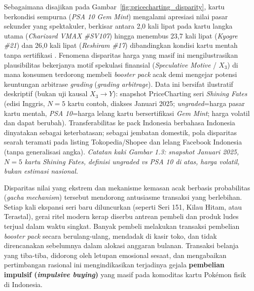 \documentclass[12pt,a4paper]{article}
\numberwithin{equation}{section}
\numberwithin{table}{section}
\numberwithin{figure}{section}
\begin{document}
Sebagaimana disajikan pada Gambar~\ref{fig:pricecharting_disparity}, kartu berkondisi sempurna (\emph{PSA 10 Gem Mint}) mengalami apresiasi nilai pasar sekunder yang spektakuler, berkisar antara 2,0 kali lipat pada kartu langka utama (\emph{Charizard VMAX \#SV107}) hingga menembus 23,7 kali lipat (\emph{Kyogre \#21}) dan 26,0 kali lipat (\emph{Reshiram \#17}) dibandingkan kondisi kartu mentah tanpa sertifikasi \citep{pricecharting2024}. Fenomena disparitas harga yang masif ini mengilustrasikan plausibilitas bekerjanya motif spekulasi finansial (\emph{Speculative Motive} / $X_3$) di mana konsumen terdorong membeli \emph{booster pack} acak demi mengejar potensi keuntungan arbitrase \emph{grading} (\emph{grading arbitrage}). Data ini bersifat ilustratif deskriptif (bukan uji kausal $X_3 \rightarrow Y$): snapshot PriceCharting seri \emph{Shining Fates} (edisi Inggris, $N=5$ kartu contoh, diakses Januari 2025; \emph{ungraded}=harga pasar kartu mentah, \emph{PSA 10}=harga lelang kartu bersertifikasi \emph{Gem Mint}; harga volatil dan dapat berubah). Transferabilitas ke pack Indonesia berbahasa Indonesia dinyatakan sebagai keterbatasan; sebagai jembatan domestik, pola disparitas searah teramati pada listing Tokopedia/Shopee dan lelang Facebook Indonesia (tanpa generalisasi angka). \emph{Catatan kaki Gambar 1.3: snapshot Januari 2025, $N=5$ kartu Shining Fates, definisi ungraded vs PSA 10 di atas, harga volatil, bukan estimasi nasional.}

Disparitas nilai yang ekstrem dan mekanisme kemasan acak berbasis probabilitas (\emph{gacha mechanism}) tersebut mendorong antusiasme transaksi yang berlebihan. Setiap kali ekspansi seri baru diluncurkan (seperti Seri 151, Kilau Hitam, atau Terastal), gerai ritel modern kerap diserbu antrean pembeli dan produk ludes terjual dalam waktu singkat. Banyak pembeli melakukan transaksi pembelian \emph{booster pack} secara berulang-ulang, mendadak di kasir toko, dan tidak direncanakan sebelumnya dalam alokasi anggaran bulanan. Transaksi belanja yang tiba-tiba, didorong oleh letupan emosional sesaat, dan mengabaikan pertimbangan rasional ini mengindikasikan terjadinya gejala \textbf{pembelian impulsif (\emph{impulsive buying})} yang masif pada komoditas kartu Pok\'emon fisik di Indonesia.
\end{document}
